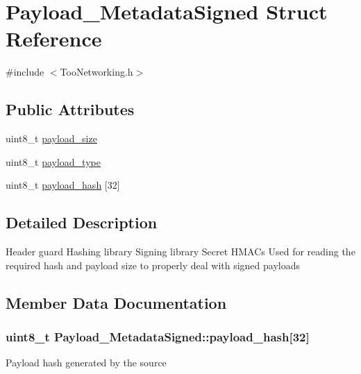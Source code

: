 \hypertarget{structPayload__MetadataSigned}{}\section{Payload\+\_\+\+Metadata\+Signed Struct Reference}
\label{structPayload__MetadataSigned}


{\ttfamily \#include $<$Too\+Networking.\+h$>$}

\subsection*{Public Attributes}
\begin{DoxyCompactItemize}
\item 
uint8\+\_\+t \hyperlink{structPayload__MetadataSigned_acc293d1cef4a0c121149eb68a834b4ea}{payload\+\_\+size}
\item 
uint8\+\_\+t \hyperlink{structPayload__MetadataSigned_a05467542863d8bfb345c11f8ccefd852}{payload\+\_\+type}
\item 
uint8\+\_\+t \hyperlink{structPayload__MetadataSigned_af6ce9dd70fb4b4cff4a317388d6e7c98}{payload\+\_\+hash} \mbox{[}32\mbox{]}
\end{DoxyCompactItemize}


\subsection{Detailed Description}
Header guard Hashing library Signing library Secret H\+M\+A\+Cs Used for reading the required hash and payload size to properly deal with signed payloads 

\subsection{Member Data Documentation}
\subsubsection[{\texorpdfstring{payload\+\_\+hash}{payload_hash}}]{\setlength{\rightskip}{0pt plus 5cm}uint8\+\_\+t Payload\+\_\+\+Metadata\+Signed\+::payload\+\_\+hash\mbox{[}32\mbox{]}}\hypertarget{structPayload__MetadataSigned_af6ce9dd70fb4b4cff4a317388d6e7c98}{}\label{structPayload__MetadataSigned_af6ce9dd70fb4b4cff4a317388d6e7c98}
Payload hash generated by the source 
